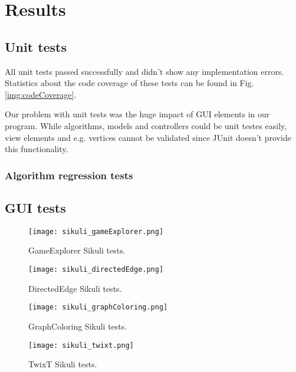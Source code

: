 \section{Results}
\label{section:results}

\subsection{Unit tests}

All unit tests passed successfully and didn't show any implementation errors. Statistics about the code coverage of these tests can be found in Fig. \ref{img:codeCoverage}.\par
Our problem with unit tests was the huge impact of GUI elements in our program. While algorithms, models and controllers could be unit testes easily, view elements and e.g. vertices cannot be validated since JUnit doesn't provide this functionality.\par

\subsubsection{Algorithm regression tests}


\subsection{GUI tests}


\begin{figure}[!h]
	\texttt{[image: sikuli\_gameExplorer.png]}
	\caption{GameExplorer Sikuli tests.}
	\label{img:sikuliGameExplorer}
\end{figure}

\begin{figure}[!h]
	\texttt{[image: sikuli\_directedEdge.png]}
	\caption{DirectedEdge Sikuli tests.}
	\label{img:sikuliDirectedEdge}
\end{figure}

\begin{figure}[!h]
	\texttt{[image: sikuli\_graphColoring.png]}
	\caption{GraphColoring Sikuli tests.}
	\label{img:sikuliGraphColoring}
\end{figure}

\begin{figure}[!h]
	\texttt{[image: sikuli\_twixt.png]}
	\caption{TwixT Sikuli tests.}
	\label{img:sikuliTwixt}
\end{figure}

